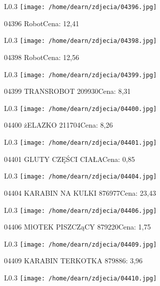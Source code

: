 \begin{wrapfigure}{L}{0.3\textwidth}
\texttt{[image: /home/dearn/zdjecia/04396.jpg]}
\end{wrapfigure}
04396 RobotCena: 12,41\newline
\begin{wrapfigure}{L}{0.3\textwidth}
\texttt{[image: /home/dearn/zdjecia/04398.jpg]}
\end{wrapfigure}
04398 RobotCena: 12,56\newline
\begin{wrapfigure}{L}{0.3\textwidth}
\texttt{[image: /home/dearn/zdjecia/04399.jpg]}
\end{wrapfigure}
04399 TRANSROBOT                                      209930Cena: 8,31\newline
\begin{wrapfigure}{L}{0.3\textwidth}
\texttt{[image: /home/dearn/zdjecia/04400.jpg]}
\end{wrapfigure}
04400 żELAZKO                                         211704Cena: 8,26\newline
\begin{wrapfigure}{L}{0.3\textwidth}
\texttt{[image: /home/dearn/zdjecia/04401.jpg]}
\end{wrapfigure}
04401 GLUTY  CZĘŚCI CIAŁACena: 0,85\newline
\begin{wrapfigure}{L}{0.3\textwidth}
\texttt{[image: /home/dearn/zdjecia/04404.jpg]}
\end{wrapfigure}
04404 KARABIN NA KULKI                               876977Cena: 23,43\newline
\begin{wrapfigure}{L}{0.3\textwidth}
\texttt{[image: /home/dearn/zdjecia/04406.jpg]}
\end{wrapfigure}
04406 MłOTEK PISZCZąCY                                879220Cena: 1,75\newline
\begin{wrapfigure}{L}{0.3\textwidth}
\texttt{[image: /home/dearn/zdjecia/04409.jpg]}
\end{wrapfigure}
04409 KARABIN TERKOTKA                               879886\Cena: 3,96\newline
\begin{wrapfigure}{L}{0.3\textwidth}
\texttt{[image: /home/dearn/zdjecia/04410.jpg]}
\end{wrapfigure}
